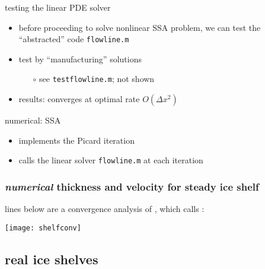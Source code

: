 \begin{frame}{testing the linear PDE solver}

\begin{itemize}
\item before proceeding to solve nonlinear SSA problem, we can test the ``abstracted'' code \texttt{flowline.m}
\item test by ``manufacturing'' solutions
  \begin{itemize}
  \item[$\circ$] see \texttt{testflowline.m}; not shown
  \end{itemize}
\item results:  converges at optimal rate $O(\Delta x^2)$
\end{itemize}
\end{frame}


\begin{frame}{numerical: SSA}

\vspace{-3mm}

\vspace{-5mm}
\small
\begin{itemize}
\item implements the Picard iteration
\item calls the linear solver \texttt{flowline.m} at each iteration
\end{itemize}
\end{frame}


\begin{frame}[fragile]
  \frametitle{\emph{numerical} thickness and velocity for steady ice shelf}

lines below are a convergence analysis of , which calls :

\begin{center}
  \texttt{[image: shelfconv]}
\end{center}
\end{frame}



\subsection{real ice shelves}

